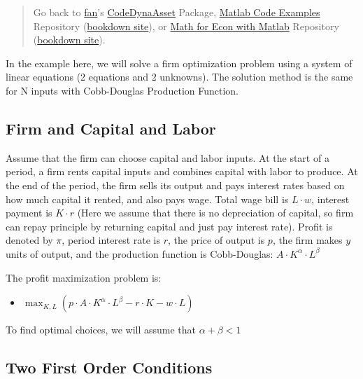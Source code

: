 \documentclass[
]{book}
\providecommand{\tightlist}{%
  \setlength{\itemsep}{0pt}\setlength{\parskip}{0pt}}
\begin{document}
\begin{quote}
Go back to \href{http://fanwangecon.github.io/}{fan}'s \href{https://fanwangecon.github.io/CodeDynaAsset/}{CodeDynaAsset} Package, \href{https://fanwangecon.github.io/M4Econ/}{Matlab Code Examples} Repository (\href{https://fanwangecon.github.io/M4Econ/bookdown}{bookdown site}), or \href{https://fanwangecon.github.io/Math4Econ/}{Math for Econ with Matlab} Repository (\href{https://fanwangecon.github.io/Math4Econ/bookdown}{bookdown site}).
\end{quote}

In the example here, we will solve a firm optimization problem using a
system of linear equations (2 equations and 2 unknowns). The solution
method is the same for N inputs with Cobb-Douglas Production Function.

\hypertarget{firm-and-capital-and-labor}{%
\subsection{Firm and Capital and Labor}\label{firm-and-capital-and-labor}}

Assume that the firm can choose capital and labor inputs. At the start
of a period, a firm rents capital inputs and combines capital with labor
to produce. At the end of the period, the firm sells its output and pays
interest rates based on how much capital it rented, and also pays wage.
Total wage bill is \(L\cdot w\), interest payment is \(K\cdot r\) (Here we
assume that there is no depreciation of capital, so firm can repay
principle by returning capital and just pay interest rate). Profit is
denoted by \(\pi\), period interest rate is \(r\), the price of output is
\(p\), the firm makes \(y\) units of output, and the production function is
Cobb-Douglas: \(A\cdot K^{\alpha } \cdot L^{\beta }\)

The profit maximization problem is:

\begin{itemize}
\tightlist
\item
  \(\displaystyle \max_{K,L} \left(p\cdot A\cdot K^{\alpha } \cdot L^{\beta } -r\cdot K-w\cdot L\right)\)
\end{itemize}

To find optimal choices, we will assume that \(\alpha +\beta <1\)

\hypertarget{two-first-order-conditions}{%
\subsection{Two First Order Conditions}\label{two-first-order-conditions}}
\end{document}
